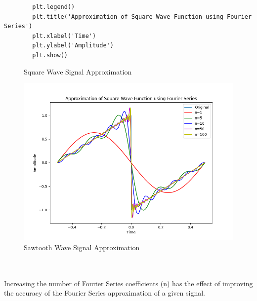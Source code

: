 \documentclass[10pt,a4paper, margin=1in]{article}
\begin{document}
\begin{enumerate}
\begin{enumerate}
\begin{verbatim}
        plt.legend()
        plt.title('Approximation of Square Wave Function using Fourier Series')
        plt.xlabel('Time')
        plt.ylabel('Amplitude')
        plt.show()
        \end{verbatim}
    \end{enumerate}
    \newpage
    \begin{figure}[htp] 
        \caption{Square Wave Signal Approximation}
        \includegraphics[scale=0.55]{hw3/sawtooth.png}
        \caption{Sawtooth Wave Signal Approximation}
    \end{figure}
\\\\Increasing the number of Fourier Series coefficients (n) has the effect of improving the accuracy of the Fourier Series approximation of a given signal.

\end{enumerate}
\end{document}

